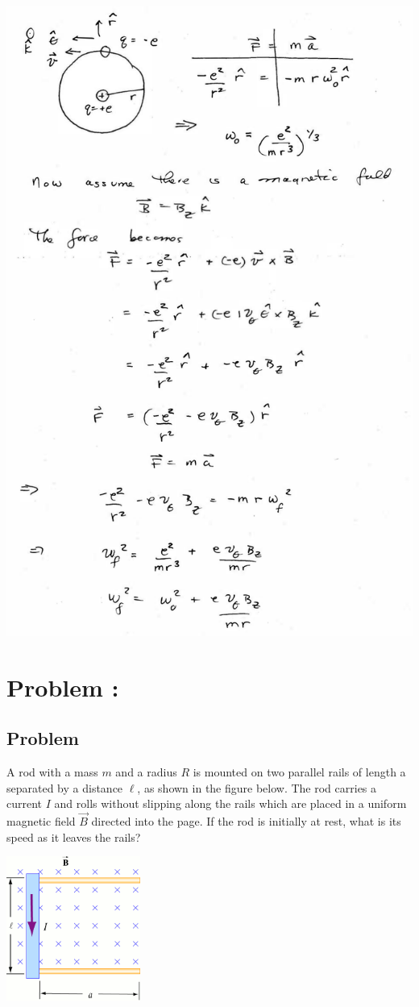 \documentclass[solutions]{esg8022pset}
\begin{document}
  \begin{center}\includegraphics[width=\textwidth]{ps07_sol_02_4.pdf}\end{center}
\section{Problem \thesection: }
\subsection{Problem}
  A rod with a mass $m$ and a radius $R$ is mounted on two parallel rails of length a separated by a distance $\ell$, as shown in the figure below. The rod carries a current $I$ and rolls without slipping along the rails which are placed in a uniform magnetic field $\vec B$ directed into the page. If the rod is initially at rest, what is its speed as it leaves the rails?
  \begin{center}\includegraphics[width=0.33\textwidth]{ps07_03}\end{center}
\end{document}

